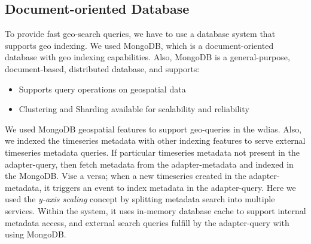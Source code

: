 \subsection{Document-oriented Database}
\label{subse:mongodb}

To provide fast geo-search queries, we have to use a database system that supports geo indexing. We used MongoDB, which is a document-oriented database with geo indexing capabilities. Also, MongoDB \cite{mongodbMongoDBManual} is a general-purpose, document-based, distributed database, and supports: 

\begin{itemize}
  \item Supports query operations on geospatial data \cite{mongodbMongoDBManual}
  \item Clustering and Sharding available for scalability and reliability
\end{itemize}

We used MongoDB geospatial features to support geo-queries in the \acrshort{wdias}. Also, we indexed the timeseries metadata with other indexing features to serve external timeseries metadata queries. If particular timeseries metadata not present in the adapter-query, then fetch metadata from the adapter-metadata and indexed in the MongoDB. Vise a versa; when a new timeseries created in the adapter-metadata, it triggers an event to index metadata in the adapter-query.
Here we used the \emph{y-axis scaling} concept by splitting metadata search into multiple services. Within the system, it uses in-memory database cache to support internal metadata access, and external search queries fulfill by the adapter-query with using MongoDB.

